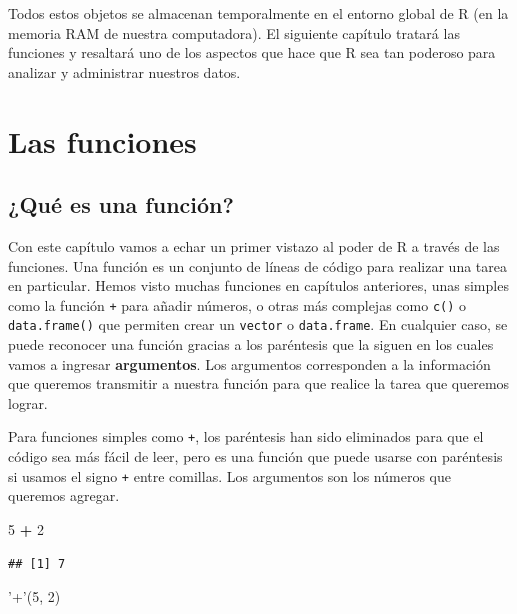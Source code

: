 \documentclass[]{book}
\makeatletter
\newenvironment{Shaded}{\begin{snugshade}}{\end{snugshade}}
\newcommand{\DecValTok}[1]{\textcolor[rgb]{0.00,0.00,0.81}{#1}}
\newcommand{\StringTok}[1]{\textcolor[rgb]{0.31,0.60,0.02}{#1}}
\newcommand{\OperatorTok}[1]{\textcolor[rgb]{0.81,0.36,0.00}{\textbf{#1}}}
\newcommand{\NormalTok}[1]{#1}
\newenvironment{kframe}{%
\medskip{}
\setlength{\fboxsep}{.8em}
 \def\at@end@of@kframe{}%
 \ifinner\ifhmode%
  \def\at@end@of@kframe{\end{minipage}}%
  \begin{minipage}{\columnwidth}%
 \fi\fi%
 \def\FrameCommand##1{\hskip\@totalleftmargin \hskip-\fboxsep
 \colorbox{shadecolor}{##1}\hskip-\fboxsep
     \hskip-\linewidth \hskip-\@totalleftmargin \hskip\columnwidth}%
 \MakeFramed {\advance\hsize-\width
   \@totalleftmargin\z@ \linewidth\hsize
   \@setminipage}}%
 {\par\unskip\endMakeFramed%
 \at@end@of@kframe}
\newenvironment{rmdblock}[1]
  {
  \begin{itemize}
  \renewcommand{\labelitemi}{
    \raisebox{-.7\height}[0pt][0pt]{
      {\setkeys{Gin}{width=3em,keepaspectratio}\texttt{[image: myIcons/\#1]}} %
    }
  }
  \setlength{\fboxsep}{1em}
  \begin{kframe}
  \item
  }
  {
  \end{kframe}
  \end{itemize}
  }
\newenvironment{rmdnote}      %
  {\begin{rmdblock}{note}}    %
  {\end{rmdblock}}            %
\makeatother
\begin{document}
Todos estos objetos se almacenan temporalmente en el entorno global de R
(en la memoria RAM de nuestra computadora). El siguiente capítulo
tratará las funciones y resaltará uno de los aspectos que hace que R sea
tan poderoso para analizar y administrar nuestros datos.

\chapter{Las funciones}\label{fonctions}

\section{¿Qué es una función?}\label{que-es-una-funcion}

Con este capítulo vamos a echar un primer vistazo al poder de R a través
de las funciones. Una función es un conjunto de líneas de código para
realizar una tarea en particular. Hemos visto muchas funciones en
capítulos anteriores, unas simples como la función \texttt{+} para
añadir números, o otras más complejas como \texttt{c()} o
\texttt{data.frame()} que permiten crear un \texttt{vector} o
\texttt{data.frame}. En cualquier caso, se puede reconocer una función
gracias a los paréntesis que la siguen en los cuales vamos a ingresar
\textbf{argumentos}. Los argumentos corresponden a la información que
queremos transmitir a nuestra función para que realice la tarea que
queremos lograr.

\begin{rmdnote}
Para funciones simples como \texttt{+}, los paréntesis han sido
eliminados para que el código sea más fácil de leer, pero es una función
que puede usarse con paréntesis si usamos el signo \texttt{+} entre
comillas. Los argumentos son los números que queremos agregar.
\end{rmdnote}

\begin{Shaded}
\begin{Highlighting}[]
\DecValTok{5} \OperatorTok{+}\StringTok{ }\DecValTok{2}
\end{Highlighting}
\end{Shaded}

\begin{verbatim}
## [1] 7
\end{verbatim}

\begin{Shaded}
\begin{Highlighting}[]
\StringTok{'+'}\NormalTok{(}\DecValTok{5}\NormalTok{, }\DecValTok{2}\NormalTok{)}
\end{Highlighting}
\end{Shaded}
\end{document}
